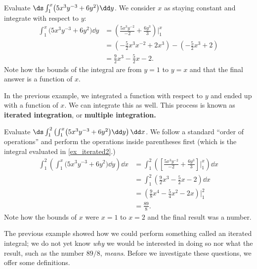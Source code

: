 \begin{example}\label{ex_iterated2}
Evaluate $\ds \int_1^x\bigl(5x^3y^{-3}+6y^2\bigr)\dd y$.
\solution
We consider $x$ as staying constant and integrate with respect to $y$:
\begin{align*}
\int_1^x\bigl(5x^3y^{-3}+6y^2\bigr)\dd y & = \left(\frac{5x^3y^{-2}}{-2}+\frac{6y^3}{3}\right)\Bigg|_1^x \\
						&= \left(-\frac52x^3x^{-2}+2x^3\right) - \left(-\frac52x^3+2\right) \\
						&= \frac92x^3-\frac52x-2.
\end{align*}
Note how the bounds of the integral are from $y=1$ to $y=x$ and that the final answer is a function of $x$.
\end{example}

In the previous example, we integrated a function with respect to $y$ and ended up with a function of $x$. We can integrate this as well. This process is known as \textbf{iterated integration}, or \textbf{multiple integration.}


\begin{example}\label{ex_iterated3}
Evaluate $\ds \int_1^2\left(\int_1^x\bigl(5x^3y^{-3}+6y^2\bigr)\dd y\right)\dd x$.
\solution
We follow a standard ``order of operations'' and perform the operations inside parentheses first (which is the integral evaluated in \autoref{ex_iterated2}.)
\begin{align*}
\int_1^2\left(\int_1^x\bigl(5x^3y^{-3}+6y^2\bigr)\dd y\right)\dd x &= \int_1^2 \left(\left[\frac{5x^3y^{-2}}{-2}+\frac{6y^3}{3}\right]\Bigg|_1^x\right)\dd x \\
			&= \int_1^2 \left(\frac92x^3-\frac52x-2\right)\dd x \\
			&= \left(\frac98x^4-\frac54x^2-2x\right)\Bigg|_1^2\\
			&= \frac{89}8.
\end{align*}
Note how the bounds of $x$ were $x=1$ to $x=2$ and the final result was a number.
\end{example}

The previous example showed how we could perform something called an iterated integral; we do not yet know \emph{why} we would be interested in doing so nor what the result, such as the number $89/8$, \emph{means}. Before we investigate these questions, we offer some definitions.

